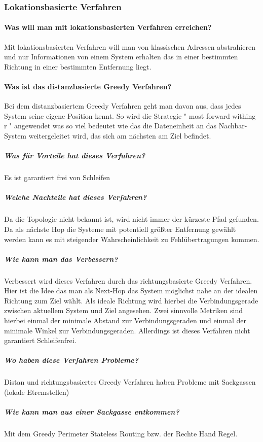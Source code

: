 	\subsubsection{Lokationsbasierte Verfahren}
	
	\paragraph{Was will man mit lokationsbasierten Verfahren erreichen?}
	Mit lokationsbasierten Verfahren will man von klassischen Adressen abstrahieren und nur Informationen von einem System erhalten das in einer bestimmten Richtung in einer bestimmten Entfernung liegt.
	
	\paragraph{Was ist das distanzbasierte Greedy Verfahren?}
	Bei dem distanzbasiertem Greedy Verfahren geht man davon aus, dass jedes System seine eigene Position kennt. So wird die Strategie " most forward withing r " angewendet was so viel bedeutet wie das die Dateneinheit an das Nachbar-System weitergeleitet wird, das sich am nächsten am Ziel befindet.
	\subparagraph{Was für Vorteile hat dieses Verfahren?}
	Es ist garantiert frei von Schleifen
	\subparagraph{Welche Nachteile hat dieses Verfahren?}
	Da die Topologie nicht bekannt ist, wird nicht immer der kürzeste Pfad gefunden. Da als nächste Hop die Systeme mit potentiell größter Entfernung gewählt werden kann es mit steigender Wahrscheinlichkeit zu Fehlübertragungen kommen.
	
	\subparagraph{Wie kann man das Verbessern?}
	Verbessert wird dieses Verfahren durch das richtungsbasierte Greedy Verfahren. Hier ist die Idee das man als Next-Hop das System möglichst nahe an der idealen Richtung zum Ziel wählt. Als 
ideale Richtung wird hierbei die Verbindungsgerade zwischen aktuellem System und Ziel angesehen. Zwei sinnvolle Metriken sind hierbei einmal der minimale Abstand zur Verbindungsgeraden und einmal der minimale Winkel zur Verbindungsgeraden. Allerdings ist dieses Verfahren nicht garantiert Schleifenfrei.
	\subparagraph{Wo haben diese Verfahren Probleme?}
	Distan und richtungsbasiertes Greedy Verfahren haben Probleme mit Sackgassen (lokale Etremstellen)	
	\subparagraph{Wie kann man aus einer Sackgasse entkommen?}
	Mit dem Greedy Perimeter Stateless Routing bzw. der Rechte Hand Regel.
	
